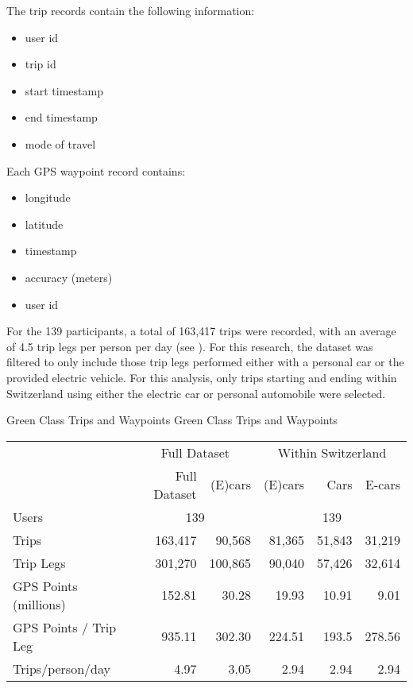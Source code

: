The trip records contain the following information:
\begin{itemize}
  \item user id
  \item trip id
  \item start timestamp
  \item end timestamp
  \item mode of travel
\end{itemize}

Each GPS waypoint record contains: 
\begin{itemize}
  \item longitude
  \item latitude
  \item timestamp
  \item accuracy (meters)
  \item user id
\end{itemize}

For the 139 participants, a total of 163,417 trips were recorded, with an average of 4.5 trip legs per person per day (see ).
For this research, the dataset was filtered to only include those trip legs performed either with a personal car or the provided electric vehicle.
For this analysis, only trips starting and ending within Switzerland using either the electric car or personal automobile were selected.


\createtable%
{Green Class Trips and Waypoints}%
{Green Class Trips and Waypoints}%
{\label{tab:green_class_gps_summary}}%
{%
\begin{tabular}{ l | r r | r r r}
                    & \multicolumn{2}{c|}{Full Dataset}  & \multicolumn{3}{c}{Within Switzerland}  \\ 
 
                    & Full Dataset  &   (E)cars & (E)cars   & Cars & E-cars \\ 
\hline
 Users            & \multicolumn{2}{c|}{139} & \multicolumn{3}{c}{139} \\  
 Trips            & 163,417       & 90,568    & 81,365    & 51,843    & 31,219\\  
 Trip Legs        & 301,270     & 100,865   & 90,040    & 57,426    & 32,614\\  
 GPS Points (millions)      &  152.81  &   30.28    &    19.93    & 10.91 & 9.01 \\ 
 GPS Points / Trip Leg &  935.11   &    302.30    &  224.51     &   193.5   &  278.56  \\  
 Trips/person/day & 4.97          & 3.05      & 2.94      & 2.94      & 2.94 \\  
\end{tabular}
}
{}



